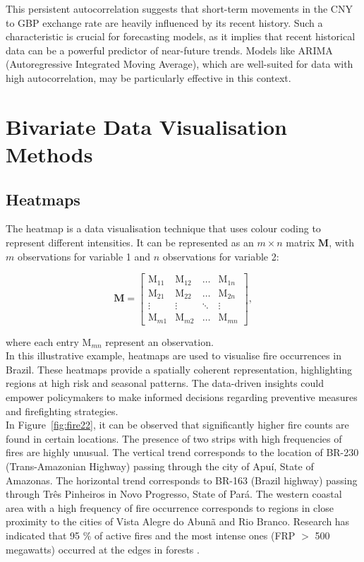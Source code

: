 \documentclass{article}\usepackage[]{graphicx}\usepackage[]{xcolor}
\numberwithin{equation}{section}
\begin{document}
\noindent
This persistent autocorrelation suggests that short-term movements in the CNY to GBP exchange rate are heavily influenced by its recent history. Such a characteristic is crucial for forecasting models, as it implies that recent historical data can be a powerful predictor of near-future trends. Models like ARIMA (Autoregressive Integrated Moving Average), which are well-suited for data with high autocorrelation, may be particularly effective in this context.


\newpage
\section{Bivariate Data Visualisation Methods}


\subsection{Heatmaps}
The heatmap is a data visualisation technique that uses colour coding to represent different intensities. It can be represented as an $m \times n$ matrix $\mathbf{M}$, with $m$ observations for variable 1 and $n$ observations for variable 2:

$$\mathbf{M} =
\left[
\begin{array}{cccc}
    \mathrm{M}_{11} & \mathrm{M}_{12} & \ldots & \mathrm{M}_{1n} \\  
    \mathrm{M}_{21} & \mathrm{M}_{22} & \ldots & \mathrm{M}_{2n} \\  
    \vdots & \vdots & \ddots & \vdots \\  
    \mathrm{M}_{m1} & \mathrm{M}_{m2} & \ldots & \mathrm{M}_{mn}
\end{array}
\right],
$$

\noindent
where each entry $\mathrm{M}_{mn}$ represent an observation.\\

\noindent
In this illustrative example, heatmaps are used to visualise fire occurrences in Brazil. These heatmaps provide a spatially coherent representation, highlighting regions at high risk and seasonal patterns. The data-driven insights could empower policymakers to make informed decisions regarding preventive measures and firefighting strategies.\\

\noindent
In Figure~\ref{fig:fire22}, it can be observed that significantly higher fire counts are found in certain locations. The presence of two strips with high frequencies of fires are highly unusual. The vertical trend corresponds to the location of BR-230 (Trans-Amazonian Highway) passing through the city of Apuí, State of Amazonas. The horizontal trend corresponds to BR-163 (Brazil highway) passing through Três Pinheiros in Novo Progresso, State of Pará. The western coastal area with a high frequency of fire occurrence corresponds to regions in close proximity to the cities of Vista Alegre do Abunã and Rio Branco. Research has indicated that 95 \% of active fires and the most intense ones (FRP $>$ 500 megawatts) occurred at the edges in forests \cite{forest}.\\
\end{document}
